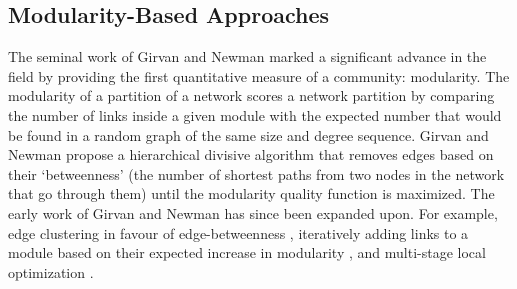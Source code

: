 \documentclass{report}
\begin{document}
	\subsection{Modularity-Based Approaches}
	The seminal work of Girvan and Newman \cite{girvan2002community} marked a significant advance in the field by providing the first quantitative measure of a community: modularity. 
	The modularity of a partition of a network 
	scores a network partition by comparing the number of links inside a given module with the expected number that would be found in a random graph of the same size and degree sequence. 
	Girvan and Newman propose a hierarchical divisive algorithm that removes edges based on their `betweenness' (the number of shortest paths from two nodes in the network that go through them) until the modularity quality function is maximized. 
	The early work of Girvan and Newman has since been expanded upon.
	For example, edge clustering in favour of edge-betweenness \cite{radicchi2004defining}, iteratively adding links to a module based on their expected increase in modularity \cite{clauset2004finding}, and multi-stage local optimization \cite{blondel2008fast}.
	
	
\end{document}
